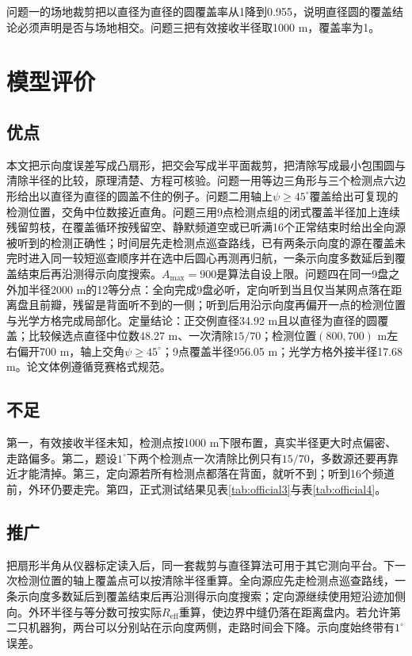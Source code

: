 \documentclass{cumcmthesis}
\begin{document}
问题一的场地裁剪把以直径为直径的圆覆盖率从1降到0.955，说明直径圆的覆盖结论必须声明是否与场地相交。问题三把有效接收半径取1000 m，覆盖率为1。

\FloatBarrier
\section{模型评价}

\subsection{优点}

本文把示向度误差写成凸扇形，把交会写成半平面裁剪，把清除写成最小包围圆与清除半径的比较，原理清楚、方程可核验。问题一用等边三角形与三个检测点六边形给出以直径为直径的圆盖不住的例子。问题二用轴上$\psi\ge 45^\circ$覆盖给出可复现的检测位置，交角中位数接近直角。问题三用9点检测点组的闭式覆盖半径加上连续残留剪枝，在覆盖循环按残留空、静默频道空或已听满16个正常结束时给出全向源被听到的检测正确性；时间层先走检测点巡查路线，已有两条示向度的源在覆盖未完时进入同一较短巡查顺序并在选中后圆心再测再归航，一条示向度多数延后到覆盖结束后再沿测得示向度搜索。$A_{\max}=900$是算法自设上限。问题四在同一9盘之外加半径2000 m的12等分点：全向完成9盘必听，定向听到当且仅当某网点落在距离盘且前瓣，残留是背面听不到的一侧；听到后用沿示向度再偏开一点的检测位置与光学方格完成局部化。定量结论：正交例直径34.92 m且以直径为直径的圆覆盖；比较候选点直径中位数48.27 m、一次清除$15/70$；检测位置$(800,700)$ m左右偏开700 m，轴上交角$\psi\ge 45^\circ$；9点覆盖半径956.05 m；光学方格外接半径17.68 m。论文体例遵循竞赛格式规范\cite{format}。

\subsection{不足}

第一，有效接收半径未知，检测点按1000 m下限布置，真实半径更大时点偏密、走路偏多。第二，题设$1^\circ$下两个检测点一次清除比例只有$15/70$，多数源还要再靠近才能清掉。第三，定向源若所有检测点都落在背面，就听不到；听到16个频道前，外环仍要走完。第四，正式测试结果见表\ref{tab:official3}与表\ref{tab:official4}。

\subsection{推广}

把扇形半角从仪器标定读入后，同一套裁剪与直径算法可用于其它测向平台。下一次检测位置的轴上覆盖点可以按清除半径重算。全向源应先走检测点巡查路线，一条示向度多数延后到覆盖结束后再沿测得示向度搜索；定向源继续使用短沿迹加侧向。外环半径与等分数可按实际$R_{\mathrm{eff}}$重算，使边界中缝仍落在距离盘内。若允许第二只机器狗，两台可以分别站在示向度两侧，走路时间会下降。示向度始终带有$1^\circ$误差。
\end{document}
